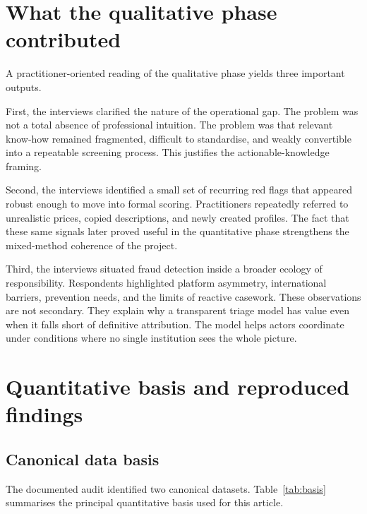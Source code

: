 \documentclass[11pt,a4paper]{article}
\begin{document}
\section{What the qualitative phase contributed}
A practitioner-oriented reading of the qualitative phase yields three important outputs.

First, the interviews clarified the nature of the operational gap. The problem was not a total absence of professional intuition. The problem was that relevant know-how remained fragmented, difficult to standardise, and weakly convertible into a repeatable screening process. This justifies the actionable-knowledge framing.

Second, the interviews identified a small set of recurring red flags that appeared robust enough to move into formal scoring. Practitioners repeatedly referred to unrealistic prices, copied descriptions, and newly created profiles. The fact that these same signals later proved useful in the quantitative phase strengthens the mixed-method coherence of the project.

Third, the interviews situated fraud detection inside a broader ecology of responsibility. Respondents highlighted platform asymmetry, international barriers, prevention needs, and the limits of reactive casework. These observations are not secondary. They explain why a transparent triage model has value even when it falls short of definitive attribution. The model helps actors coordinate under conditions where no single institution sees the whole picture.

\section{Quantitative basis and reproduced findings}
\subsection{Canonical data basis}
The documented audit identified two canonical datasets. Table~\ref{tab:basis} summarises the principal quantitative basis used for this article.
\end{document}
